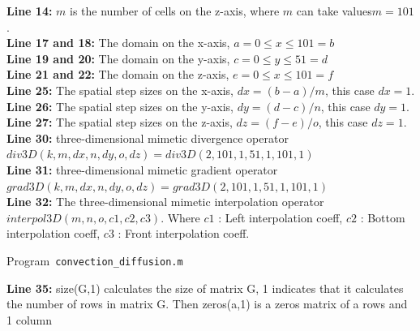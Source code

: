 \textbf{Line 14:} $m$ is the number of cells on the z-axis, where $m$ can take values ​​$m= 101$.\\

\textbf{Line 17 and 18:} The domain on the  x-axis, $a=0 \leq x \leq 101=b$\\

\textbf{Line 19 and 20:} The domain on the  y-axis, $c=0 \leq y \leq 51=d$\\

\textbf{Line 21 and 22:} The domain on the  z-axis, $e=0 \leq x \leq 101=f$\\

\textbf{Line 25:} The spatial step sizes on the x-axis, $ dx = (b-a)/m$, this case $dx = 1$.\\

\textbf{Line 26:} The spatial step sizes on the y-axis, $ dy = (d-c)/n$, this case $dy = 1$.\\

\textbf{Line 27:} The spatial step sizes on the z-axis, $ dz = (f-e)/o$, this case $dz = 1$.\\

\textbf{Line 30:} three-dimensional mimetic divergence operator $div3D(k,m,dx,n,dy,o,dz)=div3D(2,101,1,51,1,101,1)$\\

\textbf{Line 31:} three-dimensional mimetic gradient operator $grad3D(k,m,dx,n,dy,o,dz)=grad3D(2,101,1,51,1,101,1)$\\

\textbf{Line 32:} The three-dimensional mimetic interpolation operator
 $interpol3D(m, n, o, c1, c2, c3)$.  Where $c1$ : Left interpolation coeff, $c2$ : Bottom interpolation coeff, $c3$ : Front interpolation coeff.\\

\begin{listing}[ht!]
    \tiny
    \centering
    \caption{Program~\texttt{convection\_diffusion.m}}
    \label{code:convection_diffusion.m}
\end{listing}

\textbf{Line 35:} size(G,1) calculates the size of matrix G, 1 indicates that it calculates the number of rows in matrix G. Then zeros(a,1) is a zeros matrix of a rows and 1 column









